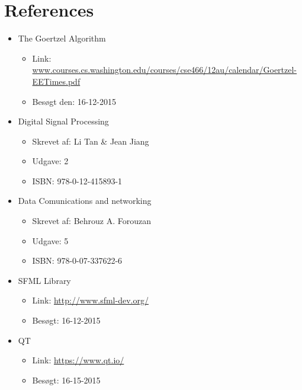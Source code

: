\section{References}

\begin{itemize}[noitemsep]
  \item The Goertzel Algorithm
  \begin{itemize}[noitemsep]
    \item Link: \url{www.courses.cs.washington.edu/courses/cse466/12au/calendar/Goertzel-EETimes.pdf}
    \item Besøgt den: 16-12-2015
  \end{itemize}
  
  \item Digital Signal Processing
  \begin{itemize}[noitemsep]
  	\item Skrevet af: Li Tan \& Jean Jiang
  	\item Udgave: 2
  	\item ISBN: 978-0-12-415893-1
  \end{itemize}
  
   \item Data Comunications and networking
	\begin{itemize} [noitemsep]
	\item Skrevet af: Behrouz A. Forouzan
  	\item Udgave: 5
  	\item ISBN: 978-0-07-337622-6
\end{itemize}
  
  \item SFML Library
  \begin{itemize}[noitemsep]
    \item Link: \url{http://www.sfml-dev.org/}
    \item Besøgt: 16-12-2015
  \end{itemize}
  
  \item QT
	\begin{itemize} [noitemsep]
	\item Link: \url{https://www.qt.io/}
	\item Besøgt: 16-15-2015
\end{itemize}


 
\end{itemize}


